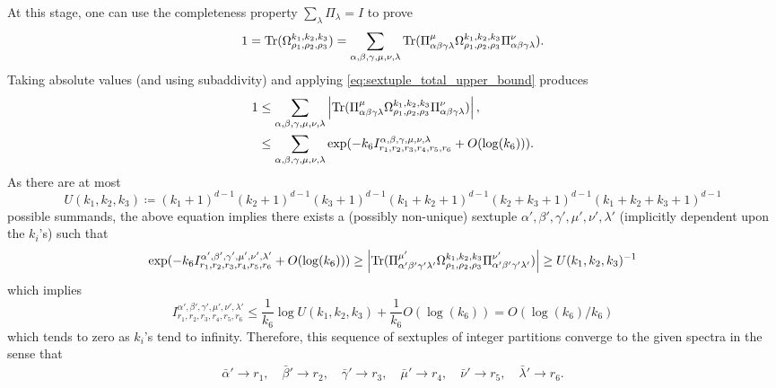 \documentclass[notitlepage, 10pt]{article}
\begin{document}
At this stage, one can use the completeness property $\sum_{\lambda} \Pi_{\lambda} = I$ to prove
\begin{equation}
    1 
    = \operatorname{Tr}(\Omega_{\rho_1,\rho_2,\rho_3}^{k_1, k_2, k_3})
    = \sum_{\alpha, \beta, \gamma, \mu, \nu, \lambda}\operatorname{Tr}(\Pi^{\mu}_{\alpha\beta\gamma\lambda} \Omega_{\rho_1,\rho_2,\rho_3}^{k_1, k_2, k_3} \Pi^{\nu}_{\alpha\beta\gamma\lambda}).
\end{equation}
Taking absolute values (and using subaddivity) and applying \cref{eq:sextuple_total_upper_bound} produces
\begin{align}
    1
    &\leq \sum_{\alpha, \beta, \gamma, \mu, \nu, \lambda}\left|\operatorname{Tr}(\Pi^{\mu}_{\alpha\beta\gamma\lambda} \Omega_{\rho_1,\rho_2,\rho_3}^{k_1, k_2, k_3} \Pi^{\nu}_{\alpha\beta\gamma\lambda})\right|, \\ 
    &\leq \sum_{\alpha, \beta, \gamma, \mu, \nu, \lambda} \exp( - k_6 I_{r_1, r_2, r_3, r_4, r_5, r_6}^{\alpha, \beta, \gamma, \mu, \nu, \lambda} + O(\log(k_6))).
\end{align}
As there are at most
\begin{equation}
    U(k_1, k_2, k_3) \coloneqq (k_1+1)^{d-1}(k_2+1)^{d-1}(k_3+1)^{d-1}(k_1+k_2+1)^{d-1}(k_2+k_3+1)^{d-1}(k_1+k_2+k_3+1)^{d-1}
\end{equation}
possible summands, the above equation implies there exists a (possibly non-unique) sextuple $\alpha', \beta', \gamma', \mu', \nu', \lambda'$ (implicitly dependent upon the $k_i$'s) such that
\begin{equation}
    \label{eq:occasionality_lower_bound}
    \exp( - k_6 I_{r_1, r_2, r_3, r_4, r_5, r_6}^{\alpha', \beta', \gamma', \mu', \nu', \lambda'} + O(\log(k_6))) \geq \left|\operatorname{Tr}(\Pi^{\mu'}_{\alpha'\beta'\gamma'\lambda'} \Omega_{\rho_1,\rho_2,\rho_3}^{k_1, k_2, k_3} \Pi^{\nu'}_{\alpha'\beta'\gamma'\lambda'})\right| \geq U(k_1, k_2, k_3)^{-1}
\end{equation}
which implies
\begin{equation}
    I_{r_1, r_2, r_3, r_4, r_5, r_6}^{\alpha', \beta', \gamma', \mu', \nu', \lambda'} \leq \frac{1}{k_6}\log U(k_1,k_2,k_3) + \frac{1}{k_6}O(\log(k_6)) = O(\log(k_6)/k_6)
\end{equation}
which tends to zero as $k_i$'s tend to infinity.
Therefore, this sequence of sextuples of integer partitions converge to the given spectra in the sense that
\begin{align}
    \bar \alpha' \to r_1, \quad
    \bar \beta' \to r_2, \quad
    \bar \gamma' \to r_3, \quad
    \bar \mu' \to r_4, \quad
    \bar \nu' \to r_5, \quad
    \bar \lambda' \to r_6.
\end{align}
\end{document}
